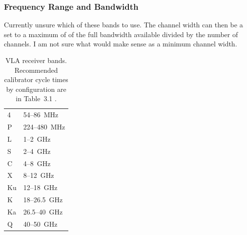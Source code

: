 \documentclass[11pt]{article}
\begin{document}
\subsubsection{Frequency Range and Bandwidth}
\label{sec:param-frequency-range}

Currently unsure which of these bands to use.
The channel width can then be a set to a maximum of of the full bandwidth available divided by the number of channels.
I am not sure what would make sense as a minimum channel width.

\begin{table}[H]
\centering
\begin{tabular}{ll}
4  & 54--86~MHz \\
P  & 224--480~MHz \\
L  & 1--2~GHz \\
S  & 2--4~GHz \\
C  & 4--8~GHz \\
X  & 8--12~GHz \\
Ku & 12--18~GHz \\
K  & 18--26.5~GHz \\
Ka & 26.5--40~GHz \\
Q  & 40--50~GHz \\
\end{tabular}
\caption{VLA receiver bands. Recommended calibrator cycle times by configuration are in Table~3.1 \cite{nrao-vla-obsguide}.}
\label{tab:vla-bands}
\end{table}










\end{document}
